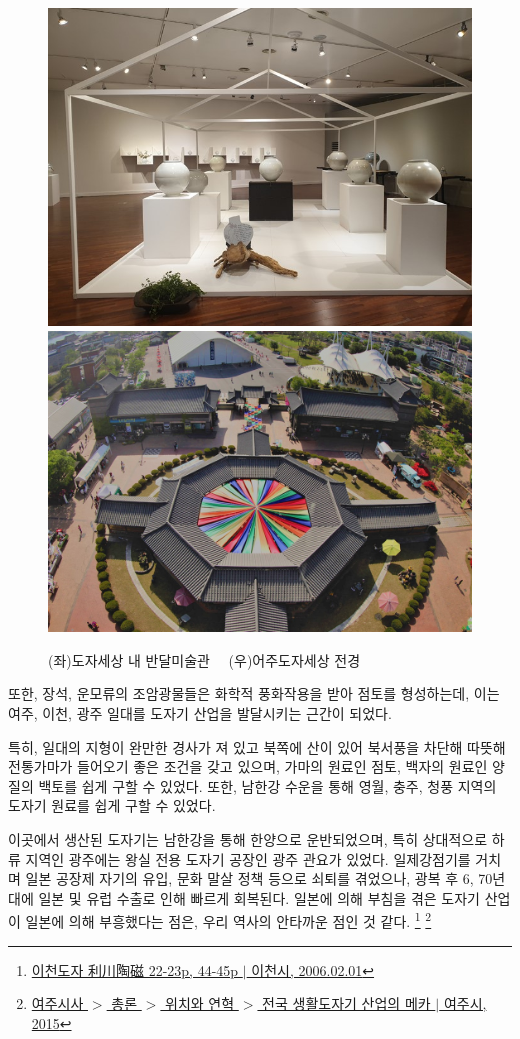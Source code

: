  \begin{figure}[ht]
    \centering
    \includegraphics[width=.4\textwidth]{img/도자전.jpg}
    \includegraphics[width=.4\textwidth]{img/여주도자세상.jpg}
    \caption{(좌)도자세상 내 반달미술관\protect\footnotemark $\quad$ (우)어주도자세상 전경\protect\footnotemark}
    \label{fig:my_labe3}
\end{figure}

또한, 장석, 운모류의 조암광물들은 화학적 풍화작용을 받아 점토를 형성하는데,
이는 여주, 이천, 광주 일대를 도자기 산업을 발달시키는 근간이 되었다.

특히, 일대의 지형이 완만한 경사가 져 있고
북쪽에 산이 있어 북서풍을 차단해 따뜻해 전통가마가 들어오기 좋은 조건을 갖고 있으며,
가마의 원료인 점토, 백자의 원료인 양질의 백토를 쉽게 구할 수 있었다.
또한, 남한강 수운을 통해 영월, 충주, 청풍 지역의 도자기 원료를 쉽게 구할 수 있었다.

이곳에서 생산된 도자기는 남한강을 통해 한양으로 운반되었으며,
특히 상대적으로 하류 지역인 광주에는 왕실 전용 도자기 공장인 광주 관요가 있었다.
일제강점기를 거치며 일본 공장제 자기의 유입, 문화 말살 정책 등으로 쇠퇴를 겪었으나,
광복 후 6, 70년대에 일본 및 유럽 수출로 인해 빠르게 회복된다.
일본에 의해 부침을 겪은 도자기 산업이 일본에 의해 부흥했다는 점은, 우리 역사의 안타까운 점인 것 같다.
\footnote{\href{https://memory.library.kr/items/show/37951}{이천도자 利川陶磁 22-23p, 44-45p $|$ 이천시, 2006.02.01}}
\footnote{ \href{https://www.yeoju.go.kr/history/main.jsp}{여주시사 $>$ 총론 $>$ 위치와 연혁 $>$ 전국 생활도자기 산업의 메카 $|$ 여주시, 2015}}

